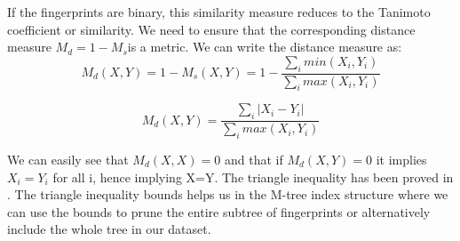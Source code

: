 If the fingerprints are binary, this similarity measure reduces to the Tanimoto coefficient or similarity. We need to ensure that the corresponding distance measure $M_d=1- M_s$is a metric. We can write the distance measure as:
\begin{equation}
 M_d(X,Y) = 1- M_s(X,Y) = 1- \frac{\sum \limits_{i} min(X_i, Y_i)}{\sum \limits_{i} max(X_i, Y_i)}
\end{equation} 

\begin{equation}
 M_d(X,Y)= \frac{\sum \limits_{i} |X_i - Y_i|}{\sum \limits_{i} max(X_i, Y_i)}
\end{equation} 

We can easily see that $M_d(X,X)=0$ and that if $M_d(X,Y)=0 $ it implies $X_i = Y_i$ for all i, hence implying X=Y. The triangle inequality has been proved in \citet*{lipkus1999proof}. The triangle inequality bounds helps us in the M-tree index structure where we can use the bounds to prune the entire subtree of fingerprints or alternatively include the whole tree in our dataset.




